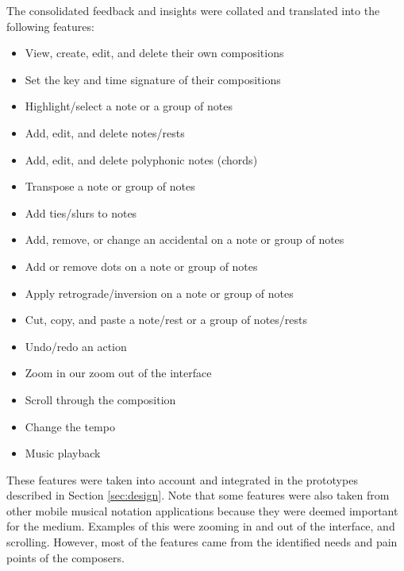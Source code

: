 			The consolidated feedback and insights were collated and translated into the following features: 
			\begin{itemize}
    			\item View, create, edit, and delete their own compositions
    			\item Set the key and time signature of their compositions
    			\item Highlight/select a note or a group of notes
             	\item Add, edit, and delete notes/rests 
              	\item Add, edit, and delete polyphonic notes (chords)
           		\item Transpose a note or group of notes
        		\item Add ties/slurs to notes
              	\item Add, remove, or change an accidental on a note or group of notes
              	\item Add or remove dots on a note or group of notes
              	\item Apply retrograde/inversion on a note or group of notes
              	\item Cut, copy, and paste a note/rest or a group of notes/rests
              	\item Undo/redo an action
              	\item Zoom in our zoom out of the interface
              	\item Scroll through the composition
              	\item Change the tempo
              	\item Music playback
          	\end{itemize}		


          	These features were taken into account and integrated in the prototypes described in Section \ref{sec:design}. Note that some features were also taken from other mobile musical notation applications because they were deemed important for the medium. Examples of this were zooming in and out of the interface, and scrolling. However, most of the features came from the identified needs and pain points of the composers. 


